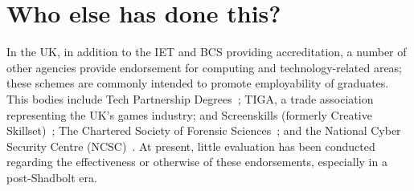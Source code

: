 \documentclass[sigconf]{acmart}
\begin{document}
\section {Who else has done this?}	

In the UK, in addition to the IET and BCS providing accreditation, a
number of other agencies provide endorsement for computing and
technology-related areas; these schemes are commonly intended to
promote employability of graduates. This bodies include Tech
Partnership Degrees~\cite{TP2019}; TIGA, a trade association
representing the UK's games industry; and Screenskills (formerly
Creative Skillset)~\cite{Screenskills2019}; The Chartered Society of
Forensic Sciences~\cite{CSOFS2019}; and the National Cyber Security
Centre (NCSC)~\cite{NCSC2018a}. At present, little evaluation has been
conducted regarding the effectiveness or otherwise of these
endorsements, especially in a post-Shadbolt era.



\end{document}
